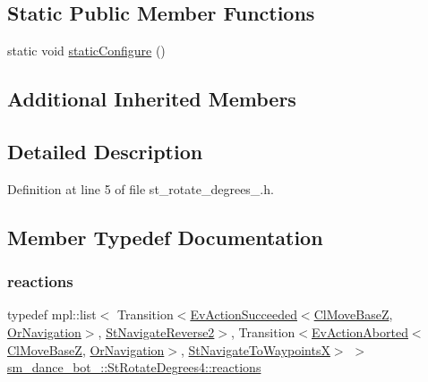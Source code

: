 \subsection*{Static Public Member Functions}
\begin{DoxyCompactItemize}
\item 
static void \hyperlink{structsm__dance__bot__2_1_1StRotateDegrees4_a553d00b558b39dc3dfa5e670bd7ee30a}{static\+Configure} ()
\end{DoxyCompactItemize}
\subsection*{Additional Inherited Members}


\subsection{Detailed Description}


Definition at line 5 of file st\+\_\+rotate\+\_\+degrees\+\_.\+h.



\subsection{Member Typedef Documentation}
\mbox{\label{structsm__dance__bot__2_1_1StRotateDegrees4_a0724d2e37c38e720d3a9c13069d466a1}} 
\subsubsection{\texorpdfstring{reactions}{reactions}}
{\footnotesize\ttfamily typedef mpl\+::list$<$ Transition$<$\hyperlink{structsmacc_1_1default__events_1_1EvActionSucceeded}{Ev\+Action\+Succeeded}$<$\hyperlink{classcl__move__base__z_1_1ClMoveBaseZ}{Cl\+Move\+BaseZ}, \hyperlink{classsm__dance__bot__2_1_1OrNavigation}{Or\+Navigation}$>$, \hyperlink{structsm__dance__bot__2_1_1StNavigateReverse2}{St\+Navigate\+Reverse2}$>$, Transition$<$\hyperlink{structsmacc_1_1default__events_1_1EvActionAborted}{Ev\+Action\+Aborted}$<$\hyperlink{classcl__move__base__z_1_1ClMoveBaseZ}{Cl\+Move\+BaseZ}, \hyperlink{classsm__dance__bot__2_1_1OrNavigation}{Or\+Navigation}$>$, \hyperlink{structsm__dance__bot__2_1_1StNavigateToWaypointsX}{St\+Navigate\+To\+WaypointsX}$>$ $>$ \hyperlink{structsm__dance__bot__2_1_1StRotateDegrees4_a0724d2e37c38e720d3a9c13069d466a1}{sm\+\_\+dance\+\_\+bot\+\_\+::\+St\+Rotate\+Degrees4\+::reactions}}



